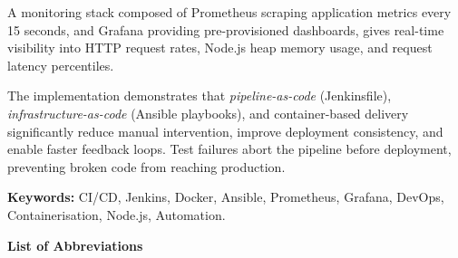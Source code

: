 \documentclass[12pt,a4paper]{report}
\begin{document}
A monitoring stack composed of Prometheus scraping application metrics every 15 seconds, and Grafana providing pre-provisioned dashboards, gives real-time visibility into HTTP request rates, Node.js heap memory usage, and request latency percentiles.

The implementation demonstrates that \textit{pipeline-as-code} (Jenkinsfile), \textit{infrastructure-as-code} (Ansible playbooks), and container-based delivery significantly reduce manual intervention, improve deployment consistency, and enable faster feedback loops. Test failures abort the pipeline before deployment, preventing broken code from reaching production.

\textbf{Keywords:} CI/CD, Jenkins, Docker, Ansible, Prometheus, Grafana, DevOps, Containerisation, Node.js, Automation.

\newpage
\tableofcontents

\newpage
\listoffigures

\newpage
\listoftables

\newpage
\begin{center}
    {\LARGE \textbf{List of Abbreviations}}
\end{center}
\vspace{0.5cm}
\begin{acronym}[XXXXXXXXX]
\end{acronym}

\end{document}
